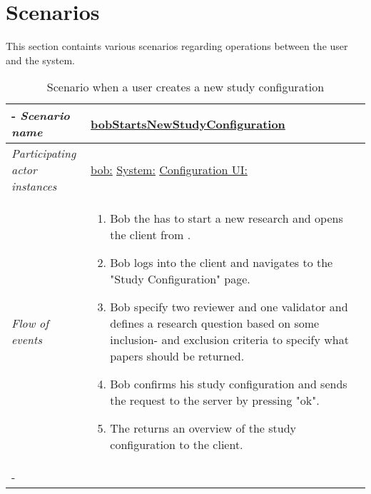\section{Scenarios}





This section containts various scenarios regarding operations between the user and the system.
%
%
\begin{table}[h!]
\tabulinesep=1.5mm
\begin{tabu} to 
	\tabucline[1.5pt]-
	\textit{Scenario name} & \underline{bobStartsNewStudyConfiguration} \\
	\hline
	\textit{Participating actor \newline instances} & \underline{bob:\researcher} \newline \underline{System:\system}
	\newline \underline{Configuration UI:\configUI} \\
	\hline
	\textit{Flow of events} &
	\vspace{-3mm}
	\begin{enumerate}[leftmargin=*,topsep=0pt,itemsep=-1ex]
		\item Bob the \researcher has to start a new research  and opens the client from \configUI. 
		\item Bob logs into the client and navigates to the "Study Configuration" page. 
		\item Bob specify two reviewer and one validator and defines a research question based on some inclusion- and exclusion criteria to specify what papers should be returned. 
		\item Bob confirms his study configuration and sends the request to the server by pressing "ok".
		\item The \system returns an overview of the study configuration to the client.
	\end{enumerate} \\
	\tabucline[1.5pt]-
\end{tabu}
\caption{Scenario when a user creates a new study configuration}
\label{sc:bobStartsNewStudyConfiguration}
\end{table}


